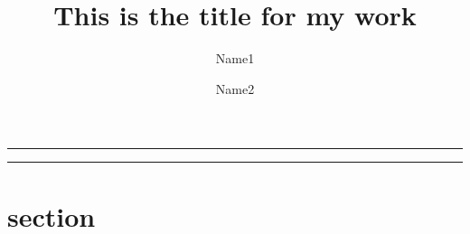 \documentclass[12pt,a4paper]{article}
\renewenvironment{abstract}{%
\hfill\begin{minipage}{0.95\textwidth}
\rule{\textwidth}{1pt}}
{\par\noindent\rule{\textwidth}{1pt}\end{minipage}}
\begin{document}
%
\title{This is the title for my work}
\author[1]{Name1}
\author[2]{Name2}
%
\maketitle
%
\begin{abstract}
\lipsum[1]
\end{abstract}
\section{section}
\lipsum
\end{document}
